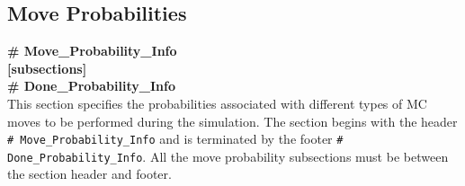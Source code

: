 %
%
%
\subsection{Move Probabilities}\label{sec:Move_Probabilities}
{\bf\# Move\_Probability\_Info \\
{[}subsections] \\
\# Done\_Probability\_Info} \\

This section specifies the probabilities associated with different types of
MC moves to be performed during the simulation.
The section begins with the header {\tt \# Move\_Probability\_Info}
and is terminated by the footer {\tt \# Done\_Probability\_Info}.
All the move probability subsections must be between the section header and footer.

